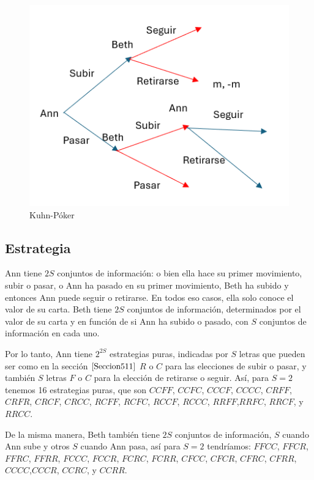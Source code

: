 \documentclass[12pt,a4paper,]{book}
\numberwithin{dummy}{section}
\theoremstyle{ocrenumbox}
\theoremstyle{blacknumex}
\theoremstyle{blacknumbox}
\theoremstyle{ocrenum}
\theoremstyle{ocrenum}
\begin{document}
\begin{figure}[H]

{\centering \includegraphics[width=0.8\linewidth]{extensiva_Kuhn} 

}

\caption{\label{forma_extensiva_VNM}Kuhn-Póker}\label{fig:forma_extensiva_VNM}
\end{figure}

\hypertarget{Seccion521}{%
\subsection{Estrategia}\label{Seccion521}}

Ann tiene \(2S\) conjuntos de información: o bien ella hace su primer
movimiento, subir o pasar, o Ann ha pasado en su primer movimiento, Beth
ha subido y entonces Ann puede seguir o retirarse. En todos eso casos,
ella solo conoce el valor de su carta. Beth tiene \(2S\) conjuntos de
información, determinados por el valor de su carta y en función de si
Ann ha subido o pasado, con \(S\) conjuntos de información en cada uno.

Por lo tanto, Ann tiene \(2^{2S}\) estrategias puras, indicadas por
\(S\) letras que pueden ser como en la sección \(\ref{Seccion511}\)
\(R\) o \(C\) para las elecciones de subir o pasar, y también \(S\)
letras \(F\) o \(C\) para la elección de retirarse o seguir. Así, para
\(S=2\) tenemos 16 estrategias puras, que son \(CCFF\), \(CCFC\),
\(CCCF\), \(CCCC\), \(CRFF\), \(CRFR\), \(CRCF\), \(CRCC\), \(RCFF\),
\(RCFC\), \(RCCF\), \(RCCC\), \(RRFF\),\(RRFC\), \(RRCF\), y \(RRCC\).

De la misma manera, Beth también tiene \(2S\) conjuntos de información,
\(S\) cuando Ann sube y otros \(S\) cuando Ann pasa, así para \(S=2\)
tendríamos: \(FFCC\), \(FFCR\), \(FFRC\), \(FFRR\), \(FCCC\), \(FCCR\),
\(FCRC\), \(FCRR\), \(CFCC\), \(CFCR\), \(CFRC\), \(CFRR\),
\(CCCC\),\(CCCR\), \(CCRC\), y \(CCRR\).
\end{document}
